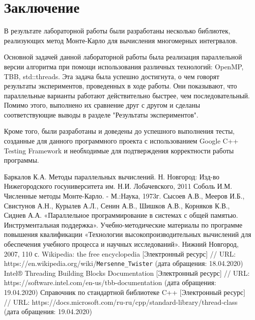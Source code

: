 \documentclass{report}
\begin{document}
\newpage


\section*{Заключение}
В результате лабораторной работы были разработаны несколько библиотек, реализующих метод Монте-Карло для вычисления многомерных интегрвалов.
\par Основной задачей данной лабораторной работы была реализация параллельной версии алгоритма при помощи использования различных технологий: OpenMP, TBB, std::threads. Эта задача была успешно достигнута, о чем говорят результаты экспериментов, проведенных в ходе работы. Они показывают, что параллельные варианты работают действительно быстрее, чем последовательный. Помимо этого, выполнено их сравнение друг с другом и сделаны соответствующие выводы в разделе "Результаты экспериментов".
\par Кроме того, были разработаны и доведены до успешного выполнения тесты, созданные для данного программного проекта с использованием Google C++ Testing Framework и необходимые для подтверждения корректности работы программы.

\newpage

\begin{thebibliography}{1}
 Баркалов К.А. Методы параллельных вычислений. Н. Новгород: Изд-во Нижегородского госуниверситета им. Н.И. Лобачевского, 2011
 Соболь И.М. Численные методы Монте-Карло. - М.:Наука, 1973г.
 Сысоев А.В., Мееров И.Б., Свистунов А.Н., Курылев А.Л., Сенин А.В., Шишков А.В., Корняков К.В., Сиднев А.А. «Параллельное программирование в системах с общей памятью. Инструментальная поддержка». Учебно-методические материалы по программе повышения квалификации «Технологии высокопроизводительных вычислений для обеспечения учебного процесса и научных исследований». Нижний Новгород, 2007, 110 с. 
 Wikipedia: the free encyclopedia [Электронный ресурс] // URL: https://en.wikipedia.org/wiki/\verb|Mersenne_Twister| (дата обращения: 18.04.2020)
 Intel® Threading Building Blocks Documentation [Электронный ресурс] // URL: https://software.intel.com/en-us/tbb-documentation (дата обращения: 19.04.2020)
 Справочник по стандартной библиотеке C++ [Электронный ресурс] // URL: https://docs.microsoft.com/ru-ru/cpp/standard-library/thread-class (дата обращения: 19.04.2020)
\end{thebibliography}
\newpage
\end{document}
